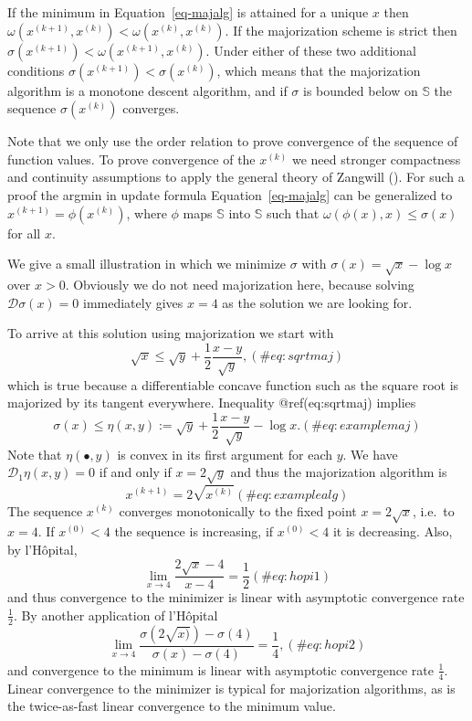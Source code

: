 \documentclass[
  12pt,
  letterpaper,
  DIV=11,
  numbers=noendperiod]{scrartcl}
\begin{document}
If the minimum in Equation~\ref{eq-majalg} is attained for a unique
\(x\) then \(\omega(x^{(k+1)},x^{(k)})<\omega(x^{(k)},x^{(k)})\). If the
majorization scheme is strict then
\(\sigma(x^{(k+1)})<\omega(x^{(k+1)},x^{(k)})\). Under either of these
two additional conditions \(\sigma(x^{(k+1)})<\sigma(x^{(k)})\), which
means that the majorization algorithm is a monotone descent algorithm,
and if \(\sigma\) is bounded below on \(\mathbb{S}\) the sequence
\(\sigma(x^{(k)})\) converges.

Note that we only use the order relation to prove convergence of the
sequence of function values. To prove convergence of the \(x^{(k)}\) we
need stronger compactness and continuity assumptions to apply the
general theory of Zangwill (). For such
a proof the argmin in update formula Equation~\ref{eq-majalg} can be
generalized to \(x^{(k+1)}=\phi(x^{(k)})\), where \(\phi\) maps
\(\mathbb{S}\) into \(\mathbb{S}\) such that
\(\omega(\phi(x),x)\leq\sigma(x)\) for all \(x\).

We give a small illustration in which we minimize \(\sigma\) with
\(\sigma(x)=\sqrt{x}-\log{x}\) over \(x>0\). Obviously we do not need
majorization here, because solving \(\mathcal{D}\sigma(x)=0\)
immediately gives \(x=4\) as the solution we are looking for.

To arrive at this solution using majorization we start with
\begin{equation}
\sqrt{x}\leq\sqrt{y}+\frac12\frac{x-y}{\sqrt{y}},
(\#eq:sqrtmaj)
\end{equation} which is true because a differentiable concave function
such as the square root is majorized by its tangent everywhere.
Inequality @ref(eq:sqrtmaj) implies \begin{equation}
\sigma(x)\leq\eta(x,y):=\sqrt{y}+\frac12\frac{x-y}{\sqrt{y}}-\log{x}.
(\#eq:examplemaj)
\end{equation} Note that \(\eta(\bullet,y)\) is convex in its first
argument for each \(y\). We have \(\mathcal{D}_1\eta(x,y)=0\) if and
only if \(x=2\sqrt{y}\) and thus the majorization algorithm is
\begin{equation}
x^{(k+1)}=2\sqrt{x^{(k)}}
(\#eq:examplealg)
\end{equation} The sequence \(x^{(k)}\) converges monotonically to the
fixed point \(x=2\sqrt{x}\), i.e.~to \(x=4\). If \(x^{(0)}<4\) the
sequence is increasing, if \(x^{(0)}<4\) it is decreasing. Also, by
l'Hôpital, \begin{equation}
\lim_{x\rightarrow 4}\frac{2\sqrt{x}-4}{x-4}=\frac12
(\#eq:hopi1)
\end{equation} and thus convergence to the minimizer is linear with
asymptotic convergence rate \(\frac12\). By another application of
l'Hôpital \begin{equation}
\lim_{x\rightarrow 4}\frac{\sigma(2\sqrt{x)})-\sigma(4)}{\sigma(x)-\sigma(4)}=\frac14,
(\#eq:hopi2)
\end{equation} and convergence to the minimum is linear with asymptotic
convergence rate \(\frac14\). Linear convergence to the minimizer is
typical for majorization algorithms, as is the twice-as-fast linear
convergence to the minimum value.
\end{document}
